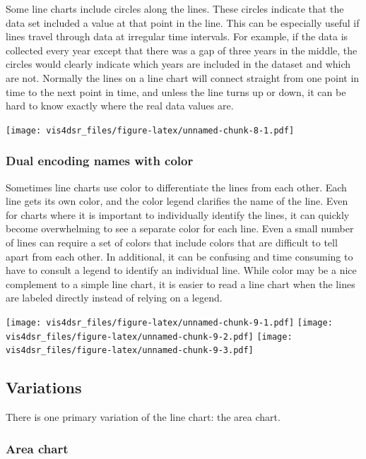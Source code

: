 \documentclass[
]{krantz}
\begin{document}
Some line charts include circles along the lines. These circles indicate that the
data set included a value at that point in the line. This can be especially useful
if lines travel through data at irregular time intervals. For example, if the data
is collected every year except that there was a gap of three years in the middle,
the circles would clearly indicate which years are included in the dataset and which
are not. Normally the lines on a line chart will connect straight from one point in
time to the next point in time, and unless the line turns up or down, it can be
hard to know exactly where the real data values are.

\texttt{[image: vis4dsr\_files/figure-latex/unnamed-chunk-8-1.pdf]}

\hypertarget{dual-encoding-names-with-color}{%
\subsubsection{Dual encoding names with color}\label{dual-encoding-names-with-color}}

Sometimes line charts use color to differentiate the lines from each other. Each line
gets its own color, and the color legend clarifies the name of the line. Even for
charts where it is important to individually identify the lines, it can quickly
become overwhelming to see a separate color for each line. Even a small number of
lines can require a set of colors that include colors that are difficult to tell
apart from each other. In additional, it can be confusing and time consuming to have
to consult a legend to identify an individual line. While color may be a nice
complement to a simple line chart, it is easier to read a line chart when the lines
are labeled directly instead of relying on a legend.

\texttt{[image: vis4dsr\_files/figure-latex/unnamed-chunk-9-1.pdf]} \texttt{[image: vis4dsr\_files/figure-latex/unnamed-chunk-9-2.pdf]} \texttt{[image: vis4dsr\_files/figure-latex/unnamed-chunk-9-3.pdf]}

\hypertarget{variations-2}{%
\subsection{Variations}\label{variations-2}}

There is one primary variation of the line chart: the area chart.

\hypertarget{area-chart}{%
\subsubsection{Area chart}\label{area-chart}}
\end{document}

